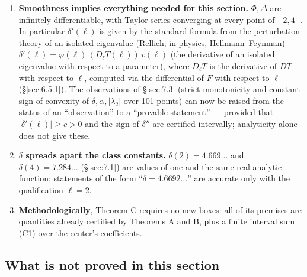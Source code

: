 \begin{enumerate}
\item[1.]
\textbf{Smoothness implies everything needed for this section.} $\Phi,\Delta$ are
   infinitely differentiable, with Taylor series converging at every point
   of $[2,4]$. In particular $\delta'(\ell)$ is given by the standard
   formula from the perturbation theory of an isolated eigenvalue (Rellich;
   in physics, Hellmann--Feynman)
   $\delta'(\ell)=\varphi(\ell)\,(D_\ell T(\ell))\,v(\ell)$ (the derivative
   of an isolated eigenvalue with respect to a parameter), where $D_\ell T$
   is the derivative of $DT$ with respect to $\ell$, computed via the
   differential of $F$ with respect to $\ell$ (\S\ref{sec:6.5.1}). The observations of
   \S\ref{sec:7.3} (strict monotonicity and constant sign of convexity of
   $\delta,\alpha,|\lambda_2|$ over 101 points) can now be raised from the
   status of an ``observation'' to a ``provable statement'' --- provided that
   $|\delta'(\ell)|\ge c>0$ and the sign of $\delta''$ are certified
   intervally; analyticity alone does not give these.

\item[2.] \textbf{\boldmath$\delta$ spreads apart the class constants.} $\delta(2)=4.669\ldots$
   and $\delta(4)=7.284\ldots$ (\S\ref{sec:7.1}) are values of one and the same
   real-analytic function; statements of the form ``$\delta=4.6692\ldots$''
   are accurate only with the qualification $\ell=2$.

\item[3.] \textbf{Methodologically}, Theorem C requires no new boxes: all of its
   premises are quantities already certified by Theorems A and B, plus a
   finite interval sum (C1) over the center's coefficients.
\end{enumerate}


\subsection{What is not proved in this section}
\label{sec:6.11}

